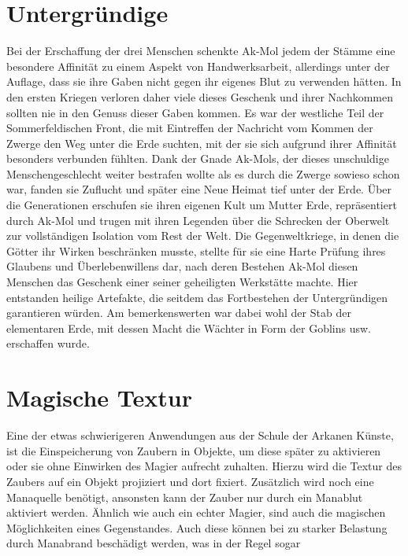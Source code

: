 \documentclass[a4paper,12pt,oneside]{book}
\begin{document}
\chapter{Untergründige}
Bei der Erschaffung der drei Menschen schenkte Ak-Mol jedem der Stämme eine besondere Affinität zu einem Aspekt von Handwerksarbeit, allerdings unter der Auflage, dass sie ihre Gaben nicht gegen ihr eigenes Blut zu verwenden hätten. In den ersten Kriegen verloren daher viele dieses Geschenk und ihrer Nachkommen sollten nie in den Genuss dieser Gaben kommen. Es war der westliche Teil der Sommerfeldischen Front, die mit Eintreffen der Nachricht vom Kommen der Zwerge den Weg unter die Erde suchten, mit der sie sich aufgrund ihrer Affinität besonders verbunden fühlten. Dank der Gnade Ak-Mols, der dieses unschuldige Menschengeschlecht weiter bestrafen wollte als es durch die Zwerge sowieso schon war, fanden sie Zuflucht und später eine Neue Heimat tief unter der Erde. Über die Generationen erschufen sie ihren eigenen Kult um Mutter Erde, repräsentiert durch Ak-Mol und trugen mit ihren Legenden über die Schrecken der Oberwelt zur vollständigen Isolation vom Rest der Welt. Die Gegenweltkriege, in denen die Götter ihr Wirken beschränken musste, stellte für sie eine Harte Prüfung ihres Glaubens und Überlebenwillens dar, nach deren Bestehen Ak-Mol diesen Menschen das Geschenk einer seiner geheiligten Werkstätte machte. Hier entstanden heilige Artefakte, die seitdem das Fortbestehen der Untergründigen garantieren würden. Am bemerkenswerten war dabei wohl der Stab der elementaren Erde, mit dessen Macht die Wächter in Form der Goblins usw. erschaffen wurde. 

\chapter{Magische Textur}
Eine der etwas schwierigeren Anwendungen aus der Schule der Arkanen Künste, ist die Einspeicherung von Zaubern in Objekte, um diese später zu aktivieren oder sie ohne Einwirken des Magier aufrecht zuhalten. Hierzu wird die Textur des Zaubers auf ein Objekt projiziert und dort fixiert. Zusätzlich wird noch eine Manaquelle benötigt, ansonsten kann der Zauber nur durch ein Manablut aktiviert werden. Ähnlich wie auch ein echter Magier, sind auch die magischen Möglichkeiten eines Gegenstandes. Auch diese können bei zu starker Belastung durch Manabrand beschädigt werden, was in der Regel sogar 
\end{document}
